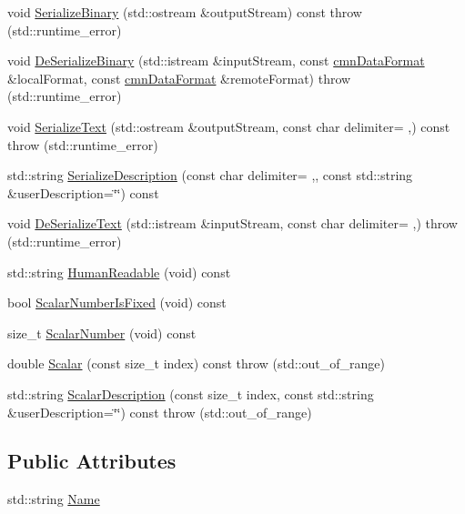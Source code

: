 \begin{DoxyCompactItemize}
\item 
void \hyperlink{classmts_command_void_description_a8f73300d3cf20874f119d4bc1ed77c1d}{Serialize\+Binary} (std\+::ostream \&output\+Stream) const   throw (std\+::runtime\+\_\+error)
\item 
void \hyperlink{classmts_command_void_description_a3fda3e49e9aca60ff86a89316701722f}{De\+Serialize\+Binary} (std\+::istream \&input\+Stream, const \hyperlink{classcmn_data_format}{cmn\+Data\+Format} \&local\+Format, const \hyperlink{classcmn_data_format}{cmn\+Data\+Format} \&remote\+Format)  throw (std\+::runtime\+\_\+error)
\item 
void \hyperlink{classmts_command_void_description_acef3373c62959147d26f92e431a0db8e}{Serialize\+Text} (std\+::ostream \&output\+Stream, const char delimiter= \textquotesingle{},\textquotesingle{}) const   throw (std\+::runtime\+\_\+error)
\item 
std\+::string \hyperlink{classmts_command_void_description_ae5839801fbc029a642fc64bee882238f}{Serialize\+Description} (const char delimiter= \textquotesingle{},\textquotesingle{}, const std\+::string \&user\+Description=\char`\"{}\char`\"{}) const 
\item 
void \hyperlink{classmts_command_void_description_aeac80ef19c065841ac86310552ae1be4}{De\+Serialize\+Text} (std\+::istream \&input\+Stream, const char delimiter= \textquotesingle{},\textquotesingle{})  throw (std\+::runtime\+\_\+error)
\item 
std\+::string \hyperlink{classmts_command_void_description_aee2a31ecb64a5e23e35e834145ff71f5}{Human\+Readable} (void) const 
\item 
bool \hyperlink{classmts_command_void_description_ad8e2201e0bd5af0e35f3bd64af0a6eb1}{Scalar\+Number\+Is\+Fixed} (void) const 
\item 
size\+\_\+t \hyperlink{classmts_command_void_description_aec84c76fd1522e65e4a55cf42ab9c86a}{Scalar\+Number} (void) const 
\item 
double \hyperlink{classmts_command_void_description_ae11ab50af5d388dac88f95557fe286a5}{Scalar} (const size\+\_\+t index) const   throw (std\+::out\+\_\+of\+\_\+range)
\item 
std\+::string \hyperlink{classmts_command_void_description_a89a603cca8292cc94ec93a9dadf0f528}{Scalar\+Description} (const size\+\_\+t index, const std\+::string \&user\+Description=\char`\"{}\char`\"{}) const   throw (std\+::out\+\_\+of\+\_\+range)
\end{DoxyCompactItemize}
\subsection*{Public Attributes}
\begin{DoxyCompactItemize}
\item 
std\+::string \hyperlink{classmts_command_void_description_a03b004586fef73637e80f22f3dbbf8f6}{Name}
\end{DoxyCompactItemize}


